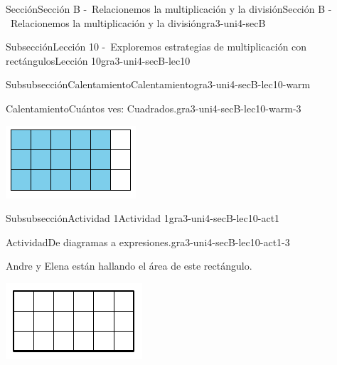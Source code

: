 \documentclass[twoside,10pt,]{article}
\begin{document}
\begin{sectionptx}{Sección}{Sección B -~Relacionemos la multiplicación y la división}{}{Sección B -~Relacionemos la multiplicación y la división}{}{}{gra3-uni4-secB}
\begin{subsectionptx}{Subsección}{Lección 10 -~Exploremos estrategias de multiplicación con rectángulos}{}{Lección 10}{}{}{gra3-uni4-secB-lec10}
\begin{subsubsectionptx}{Subsubsección}{Calentamiento}{}{Calentamiento}{}{}{gra3-uni4-secB-lec10-warm}
\begin{exploration}{Calentamiento}{Cuántos ves: Cuadrados.}{gra3-uni4-secB-lec10-warm-3}
\begin{image}{0}{1}{0}{}
\includegraphics[width=\linewidth]{external/svg-source/tikz-file-147478.pdf}
\end{image}%
\end{exploration}%
\end{subsubsectionptx}
%
%
\typeout{************************************************}
\typeout{************************************************}
%
\begin{subsubsectionptx}{Subsubsección}{Actividad 1}{}{Actividad 1}{}{}{gra3-uni4-secB-lec10-act1}
\begin{activity}{Actividad}{De diagramas a expresiones.}{gra3-uni4-secB-lec10-act1-3}%
\begin{sidebyside}{2}{0.025}{0.025}{0.05}%
\begin{sbspanel}{0.4}%
Andre y Elena están hallando el área de este rectángulo.%
\end{sbspanel}%
\begin{sbspanel}{0.5}%
\includegraphics[width=\linewidth]{external/svg-source/tikz-file-153043.pdf}
\end{sbspanel}%
\end{sidebyside}%

\end{activity}
\end{subsubsectionptx}
\end{subsectionptx}
\end{sectionptx}
\end{document}

